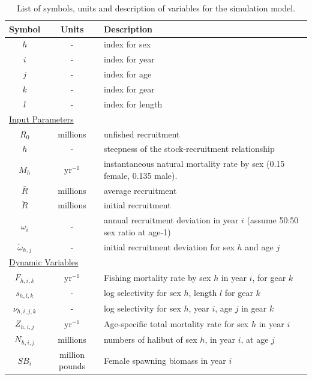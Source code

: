 \begin{table}[ht]
	\caption{List of symbols, units and description of variables for the simulation model.}
	\label{tab:ListOfSymbols}
	\begin{center}
	\begin{tabular}{ccl}
		\hline
		Symbol & Units & Description \\
		\hline
		$h$	& - & index for sex\\
		$i$	& - & index for year\\
		$j$	& - & index for age\\
		$k$	& - & index for gear\\
		$l$ & - & index for length\\
		\multicolumn{3}{l}{\underline{Input Parameters}}\\
		$R_0$	& millions	& unfished recruitment\\
		$h$		& -			& steepness of the stock-recruitment relationship\\
		$M_h$	& yr$^{-1}$	& instantaneous natural mortality rate by sex (0.15 female, 0.135 male). \\
		$\bar{R}$ & millions & average recruitment\\
		$\ddot{R}$ & millions & initial recruitment\\
		$\omega_i$ & - & annual recruitment deviation in year $i$ (assume 50:50 sex ratio at age-1)\\
		$\ddot{\omega}_{h,j}$ & - & initial recruitment deviation for sex $h$ and age $j$\\
		\multicolumn{3}{l}{\underline{Dynamic Variables}}\\
		$F_{h,i,k}$ & yr$^{-1}$ & Fishing mortality rate by sex $h$ in year $i$, for gear $k$\\
		$s_{h,l,k}$ & - & log selectivity for sex $h$, length $l$ for gear $k$\\
		$\nu_{h,i,j,k}$ & - & log selectivity for sex $h$, year $i$, age $j$ in gear $k$\\
		$Z_{h,i,j}$ & yr$^{-1}$ & Age-specific total mortality rate for sex $h$ in year $i$\\
		$N_{h,i,j}$ & millions & numbers of halibut of sex $h$, in year $i$, at age $j$\\
		$SB_{i}$ & million pounds & Female spawning biomass in year $i$\\
		\hline
	\end{tabular}
	\end{center}
\end{table}

